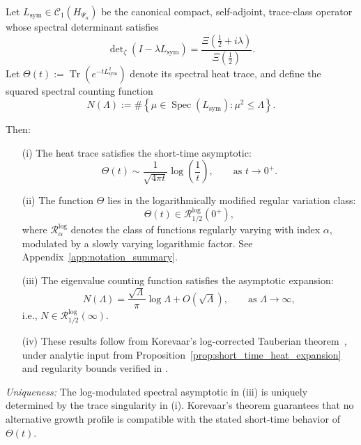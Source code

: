 \begin{lemma}
\label{lem:log_corrected_tauberian_estimate}

Let \( L_{\mathrm{sym}} \in \mathcal{C}_1(H_{\Psi_\alpha}) \) be the canonical compact, self-adjoint, trace-class operator whose spectral determinant satisfies
\[
\det\nolimits_\zeta(I - \lambda L_{\mathrm{sym}}) = \frac{\Xi\left( \tfrac{1}{2} + i\lambda \right)}{\Xi\left( \tfrac{1}{2} \right)}.
\]
Let \( \Theta(t) := \operatorname{Tr}(e^{-t L_{\mathrm{sym}}^2}) \) denote its spectral heat trace, and define the squared spectral counting function
\[
N(\Lambda) := \#\left\{ \mu \in \operatorname{Spec}(L_{\mathrm{sym}}) : \mu^2 \le \Lambda \right\}.
\]

Then:

\begin{enumerate}
  \item[\textup{(i)}] The heat trace satisfies the short-time asymptotic:
  \[
  \Theta(t) \sim \frac{1}{\sqrt{4\pi t}} \log\left(\frac{1}{t}\right), \qquad \text{as } t \to 0^+.
  \]

  \item[\textup{(ii)}] The function \( \Theta \) lies in the logarithmically modified regular variation class:
  \[
  \Theta(t) \in \mathcal{R}_{1/2}^{\log}(0^+),
  \]
  where \( \mathcal{R}_{\alpha}^{\log} \) denotes the class of functions regularly varying with index \( \alpha \), modulated by a slowly varying logarithmic factor. See Appendix~\ref{app:notation_summary}.

  \item[\textup{(iii)}] The eigenvalue counting function satisfies the asymptotic expansion:
  \[
  N(\Lambda) = \frac{\sqrt{\Lambda}}{\pi} \log \Lambda + O(\sqrt{\Lambda}),
  \qquad \text{as } \Lambda \to \infty,
  \]
  i.e., \( N \in \mathcal{R}_{1/2}^{\log}(\infty) \).

  \item[\textup{(iv)}] These results follow from Korevaar’s log-corrected Tauberian theorem~\cite[Ch.~III, §5]{Korevaar2004Tauberian}, under analytic input from Proposition~\ref{prop:short_time_heat_expansion} and regularity bounds verified in .
\end{enumerate}

\medskip

\noindent
\emph{Uniqueness:} The log-modulated spectral asymptotic in (iii) is uniquely determined by the trace singularity in (i). Korevaar's theorem guarantees that no alternative growth profile is compatible with the stated short-time behavior of \( \Theta(t) \).
\end{lemma}
